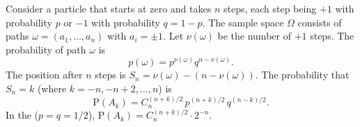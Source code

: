 Consider a particle that starts at zero and takes $n$ steps, each step being $+1$ with probability $p$ or $-1$ with probability $q = 1-p$. The sample space $\Omega$ consists of paths $\omega = (a_1, \ldots, a_n)$ with $a_i = \pm 1$. Let $\nu(\omega)$ be the number of $+1$ steps. The probability of path $\omega$ is
$$p(\omega) = p^{\nu(\omega)} q^{n - \nu(\omega)}.$$
The position after $n$ steps is $S_n = \nu(\omega) - (n - \nu(\omega))$. The probability that $S_n = k$ (where $k = -n, -n+2, \ldots, n$) is
$$\text{P}(A_k) = C_n^{(n+k)/2} \, p^{(n+k)/2} \, q^{(n-k)/2}.$$
In the  ($p = q = 1/2$), $\text{P}(A_k) = C_n^{(n+k)/2} \cdot 2^{-n}$.
